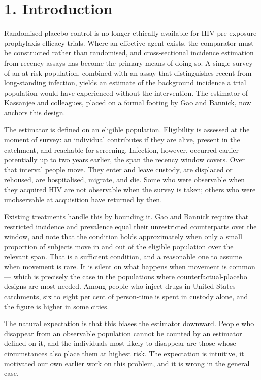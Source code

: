 \section{1. Introduction}

Randomised placebo control is no longer ethically available for HIV pre-exposure prophylaxis efficacy trials. Where an effective agent exists, the comparator must be constructed rather than randomised, and cross-sectional incidence estimation from recency assays has become the primary means of doing so. A single survey of an at-risk population, combined with an assay that distinguishes recent from long-standing infection, yields an estimate of the background incidence a trial population would have experienced without the intervention. The estimator of Kassanjee and colleagues, placed on a formal footing by Gao and Bannick, now anchors this design.

The estimator is defined on an eligible population. Eligibility is assessed at the moment of survey: an individual contributes if they are alive, present in the catchment, and reachable for screening. Infection, however, occurred earlier --- potentially up to two years earlier, the span the recency window covers. Over that interval people move. They enter and leave custody, are displaced or rehoused, are hospitalised, migrate, and die. Some who were observable when they acquired HIV are not observable when the survey is taken; others who were unobservable at acquisition have returned by then.

Existing treatments handle this by bounding it. Gao and Bannick require that restricted incidence and prevalence equal their unrestricted counterparts over the window, and note that the condition holds approximately when only a small proportion of subjects move in and out of the eligible population over the relevant span. That is a sufficient condition, and a reasonable one to assume when movement is rare. It is silent on what happens when movement is common --- which is precisely the case in the populations where counterfactual-placebo designs are most needed. Among people who inject drugs in United States catchments, six to eight per cent of person-time is spent in custody alone, and the figure is higher in some cities.

The natural expectation is that this biases the estimator downward. People who disappear from an observable population cannot be counted by an estimator defined on it, and the individuals most likely to disappear are those whose circumstances also place them at highest risk. The expectation is intuitive, it motivated our own earlier work on this problem, and it is wrong in the general case.

